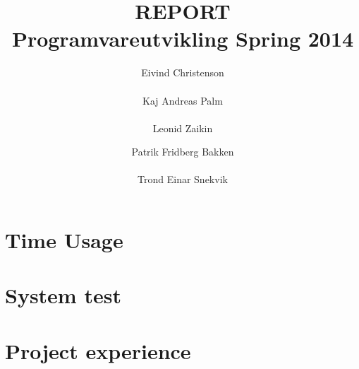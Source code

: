 \documentclass[a4paper]{report}
\author{Eivind Christenson \\\\ Kaj Andreas Palm \\\\Leonid Zaikin\and Patrik Fridberg Bakken\\\\ Trond Einar Snekvik}
\title{\MakeUppercase{\bf Report} \\ \Large{Programvareutvikling Spring 2014}}
\date{}
\begin{document}
\maketitle


\tableofcontents
\pagestyle{plain} %
\chapter{Time Usage}

\newpage
\chapter{System test}

\newpage
\chapter{Project experience}

\end{document}
